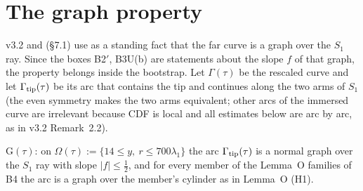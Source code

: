 \documentclass[11pt]{article}
\begin{document}
\section{The graph property}\label{C:sec:graph}
v3.2 and  (\S7.1) use as a standing fact that the far curve is a graph over the $S_1$ ray. Since the boxes B2$'$, B3U(b) are statements about the slope $f$ of that graph, the property belongs inside the bootstrap. Let $\Gamma(\tau)$ be the rescaled curve and let $\Gamma_{\rm tip}(\tau)$ be its arc that contains the tip and continues along the two arms of $S_1$ (the even symmetry makes the two arms equivalent; other arcs of the immersed curve are irrelevant because CDF is local and all estimates below are arc by arc, as in v3.2 Remark~2.2).

\begin{definition}[G]\label{C:def:G}
$\mathrm{G}(\tau)$: on $\Omega(\tau):=\{14\le y,\ r\le700\lambda_1\}$ the arc $\Gamma_{\rm tip}(\tau)$ is a normal graph over the $S_1$ ray with slope $|f|\le\frac12$, and for every member of the Lemma~O families of B4 the arc is a graph over the member's cylinder as in Lemma~O (H1).
\end{definition}
\end{document}
